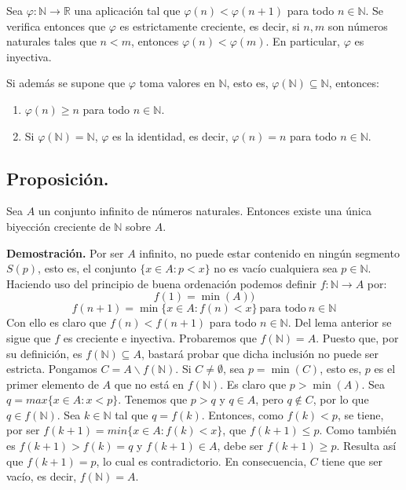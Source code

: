 \documentclass[10pt,a4paper]{article}
\begin{document}
	Sea $\varphi : \mathbb{N} \rightarrow \mathbb{R}$ una aplicación tal que $\varphi(n) < \varphi(n+1)$ para todo $n \in \mathbb{N}$. Se verifica entonces que $\varphi$ es estrictamente creciente, es decir, si $n, m$ son números naturales tales que $n < m$, entonces $\varphi(n) < \varphi(m)$. En particular, $\varphi$ es inyectiva.
	
	Si además se supone que $\varphi$ toma valores en $\mathbb{N}$, esto es, $\varphi(\mathbb{N}) \subseteq \mathbb{N}$, entonces:
	
	\begin{enumerate}[label=\roman*)]
		\item $\varphi(n) \geq n$ para todo $n \in \mathbb{N}$.
		\item Si $\varphi(\mathbb{N}) = \mathbb{N}$, $\varphi$ es la identidad, es decir, $\varphi(n) = n$ para todo $n \in \mathbb{N}$.
	\end{enumerate}
	
	\subsection{Proposición.}
	
	Sea $A$ un conjunto infinito de números naturales. Entonces existe una única biyección creciente de $\mathbb{N}$ sobre $A$.
	
	\textbf{Demostración.} Por ser $A$ infinito, no puede estar contenido en ningún segmento $S(p)$, esto es, el conjunto $\{x \in A : p < x\}$ no es vacío cualquiera sea $p \in \mathbb{N}$. Haciendo uso del principio de buena ordenación podemos definir $f : \mathbb{N} \rightarrow A$ por: 
	$$f(1) = \min(A))$$ $$f(n+1) = \min\{x \in A : f(n) < x\} ~ \text{para todo} ~ n \in \mathbb{N} $$
	Con ello es claro que $f(n) < f(n+1)$ para todo $n \in \mathbb{N}$. Del lema anterior se sigue que $f$ es creciente e inyectiva. Probaremos que $f(\mathbb{N}) = A$. Puesto que, por su definición, es $f(\mathbb{N}) \subseteq A$, bastará probar que dicha inclusión no puede ser estricta. Pongamos $C = A \backslash f(\mathbb{N})$. Si $C \neq \emptyset$, sea $p = \min(C)$, esto es, $p$ es el primer elemento de $A$ que no está en $f(\mathbb{N})$. Es claro que $p > \min(A)$. Sea $q = max\{x \in A : x < p\}$. Tenemos que $p > q$ y $q \in A$, pero $q \notin C$, por lo que $q \in f(\mathbb{N})$. Sea $k \in \mathbb{N}$ tal que $q = f(k)$. Entonces, como $f(k) < p$, se tiene, por ser $f(k+1) = min\{x \in A: f(k) < x\}$, que $f(k+1) \leq p$. Como también es $f(k+1) > f(k) = q$ y $f(k+1) \in A$, debe ser $f(k+1) \geq p$. Resulta así que $f(k+1) = p$, lo cual es contradictorio. En consecuencia, $C$ tiene que ser vacío, es decir, $f(\mathbb{N}) = A$. \newline
	
\end{document}
